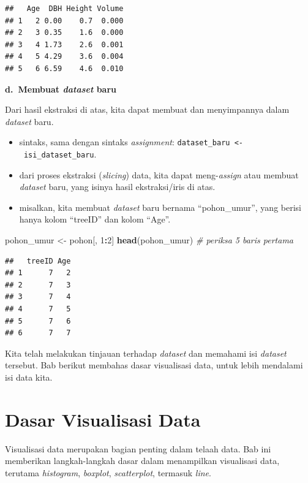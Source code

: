 \documentclass[
  12pt,
  a4paper,
]{scrbook}
\newenvironment{Shaded}{\begin{snugshade}}{\end{snugshade}}
\newcommand{\CommentTok}[1]{\textcolor[rgb]{0.56,0.35,0.01}{\textit{#1}}}
\newcommand{\DecValTok}[1]{\textcolor[rgb]{0.00,0.00,0.81}{#1}}
\newcommand{\KeywordTok}[1]{\textcolor[rgb]{0.13,0.29,0.53}{\textbf{#1}}}
\newcommand{\NormalTok}[1]{#1}
\newcommand{\OperatorTok}[1]{\textcolor[rgb]{0.81,0.36,0.00}{\textbf{#1}}}
\newcommand{\StringTok}[1]{\textcolor[rgb]{0.31,0.60,0.02}{#1}}
\providecommand{\tightlist}{%
  \setlength{\itemsep}{0pt}\setlength{\parskip}{0pt}}
\begin{document}
\begin{verbatim}
##   Age  DBH Height Volume
## 1   2 0.00    0.7  0.000
## 2   3 0.35    1.6  0.000
## 3   4 1.73    2.6  0.001
## 4   5 4.29    3.6  0.004
## 5   6 6.59    4.6  0.010
\end{verbatim}

\textbf{d.~Membuat \emph{dataset} baru}

Dari hasil ekstraksi di atas, kita dapat membuat dan menyimpannya dalam
\emph{dataset} baru.

\begin{itemize}
\tightlist
\item
  sintaks, sama dengan sintaks \emph{assignment}:
  \texttt{dataset\_baru\ \textless{}-\ isi\_dataset\_baru}.
\item
  dari proses ekstraksi (\emph{slicing}) data, kita dapat
  meng-\emph{assign} atau membuat \emph{dataset} baru, yang isinya hasil
  ekstraksi/iris di atas.
\item
  misalkan, kita membuat \emph{dataset} baru bernama ``pohon\_umur'',
  yang berisi hanya kolom ``treeID'' dan kolom ``Age''.
\end{itemize}

\begin{Shaded}
\begin{Highlighting}[]
\NormalTok{pohon_umur <-}\StringTok{ }\NormalTok{pohon[, }\DecValTok{1}\OperatorTok{:}\DecValTok{2}\NormalTok{]}
\KeywordTok{head}\NormalTok{(pohon_umur)  }\CommentTok{# periksa 5 baris pertama}
\end{Highlighting}
\end{Shaded}

\begin{verbatim}
##   treeID Age
## 1      7   2
## 2      7   3
## 3      7   4
## 4      7   5
## 5      7   6
## 6      7   7
\end{verbatim}

Kita telah melakukan tinjauan terhadap \emph{dataset} dan memahami isi
\emph{dataset} tersebut. Bab berikut membahas dasar visualisasi data,
untuk lebih mendalami isi data kita.

\newpage

\hypertarget{dasar-visualisasi-data}{%
\chapter{Dasar Visualisasi Data}\label{dasar-visualisasi-data}}

Visualisasi data merupakan bagian penting dalam telaah data. Bab ini
memberikan langkah-langkah dasar dalam menampilkan visualisasi data,
terutama \emph{histogram}, \emph{boxplot}, \emph{scatterplot}, termasuk
\emph{line}.
\end{document}
